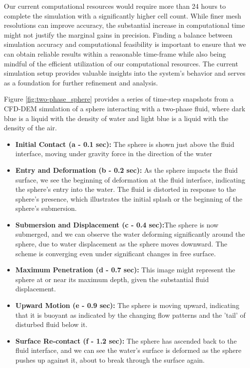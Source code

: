 Our current computational resources would require more than 24 hours to complete the simulation with a significantly higher cell count. While finer mesh resolutions can improve accuracy, the substantial increase in computational time might not justify the marginal gains in precision. Finding a balance between simulation accuracy and computational feasibility is important to ensure that we can obtain reliable results within a reasonable time-frame while also being mindful of the efficient utilization of our computational resources. The current simulation setup provides valuable insights into the system's behavior and serves as a foundation for further refinement and analysis.

Figure \ref{fig:two-phase_sphere} provides a series of time-step snapshots from a CFD-DEM simulation of a sphere interacting with a two-phase fluid, where dark blue is a liquid with the density of water and light blue is a liquid with the density of the air.

\begin{itemize}
    \item \textbf{Initial Contact (a - 0.1 sec):} The sphere is shown just above the fluid interface, moving under gravity force in the direction of the water
    \item \textbf{Entry and Deformation (b - 0.2 sec):} As the sphere impacts the fluid surface, we see the beginning of deformation at the fluid interface, indicating the sphere's entry into the water. The fluid is distorted in response to the sphere's presence, which illustrates the initial splash or the beginning of the sphere's submersion.
    \item \textbf{Submersion and Displacement (c - 0.4 sec):}The sphere is now submerged, and we can observe the water deforming significantly around the sphere, due to water displacement as the sphere moves downward. The scheme is converging even under significant changes in free surface.
    \item \textbf{Maximum Penetration (d - 0.7 sec):} This image might represent the sphere at or near its maximum depth, given the substantial fluid displacement.
    \item \textbf{Upward Motion (e - 0.9 sec):} The sphere is moving upward, indicating that it is buoyant as indicated by the changing flow patterns and the 'tail' of disturbed fluid below it.
    \item \textbf{Surface Re-contact (f - 1.2 sec):} The sphere has ascended back to the fluid interface, and we can see the water's surface is deformed as the sphere pushes up against it, about to break through the surface again.
\end{itemize}

